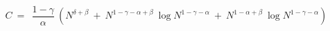   \[ C \ = \ \  \frac{1-\gamma}{\alpha} \ ( N^{\delta+\beta} \ + \ N^{1-\gamma-\alpha+\beta} \ \log N^{1-\gamma-\alpha} \ + \ N^{1-\alpha+\beta} \ \log N^{1-\gamma-\alpha})
  \]



%
%
%
%
%
%
%
%
%
%
%
%

